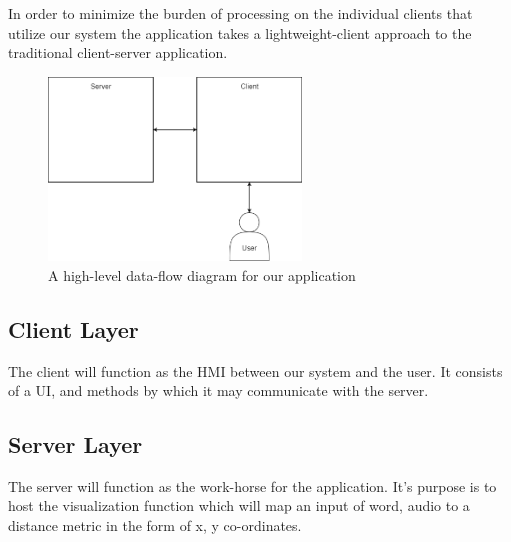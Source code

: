 In order to minimize the burden of processing on the individual clients that utilize our system the application takes a lightweight-client approach to the traditional client-server application.

\begin{figure}[h!]
	\centering
 	\includegraphics[width=0.60\textwidth]{images/layers}
 \caption{A high-level data-flow diagram for our application}
\end{figure}

\subsection{Client Layer}
The client will function as the HMI between our system and the user. It consists of a UI, and methods by which it may communicate with the server.

\subsection{Server Layer}
The server will function as the work-horse for the application. It's purpose is to host the visualization function which will map an input of word, audio to a distance metric in the form of x, y co-ordinates.
